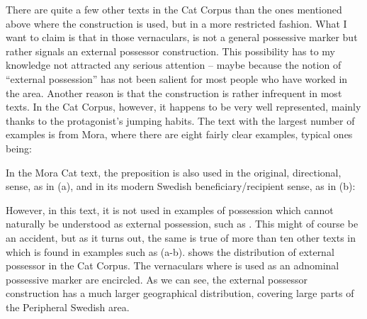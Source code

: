 There are quite a few other texts in the Cat Corpus than the ones mentioned above where the construction is used, but in a more restricted fashion. What I want to claim is that in those vernaculars, is not a general possessive marker but rather signals an external possessor construction. This possibility has to my knowledge not attracted any serious attention – maybe because the notion of “external possession” has not been salient for most people who have worked in the area. Another reason is that the construction is rather infrequent in most texts. In the Cat Corpus, however, it happens to be very well represented, mainly thanks to the protagonist’s jumping habits. The text with the largest number of examples is from Mora, where there are eight fairly clear examples, typical ones being:

\ea\label{}

\z 
\z

In the Mora Cat text, the preposition is also used in the original, directional, sense, as in (a), and in its modern Swedish beneficiary/recipient sense, as in (b):

\ea\label{}

\z 
\z

However, in this text, it is not used in examples of possession which cannot naturally be understood as external possession, such as . This might of course be an accident, but as it turns out, the same is true of more than ten other texts in which  is found in examples such as (a-b).  shows the distribution of external possessor  in the Cat Corpus. The vernaculars where  is used as an adnominal possessive marker are encircled. As we can see, the external possessor construction has a much larger geographical distribution, covering large parts of the Peripheral Swedish area. 

